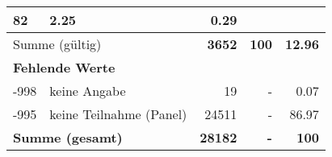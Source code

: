 \begin{longtable}{lXrrr}
       \num{82} &
       \num[round-mode=places,round-precision=2]{2.25} &
         \num[round-mode=places,round-precision=2]{0.29} \\
     \midrule
     \multicolumn{2}{l}{Summe (gültig)} &
       \textbf{\num{3652}} &
     \textbf{100} &
       \textbf{\num[round-mode=places,round-precision=2]{12.96}} \\
     \multicolumn{5}{l}{\textbf{Fehlende Werte}}\\
       -998 &
       keine Angabe &
         \num{19} &
        - &
         \num[round-mode=places,round-precision=2]{0.07} \\
       -995 &
       keine Teilnahme (Panel) &
         \num{24511} &
        - &
         \num[round-mode=places,round-precision=2]{86.97} \\
     \midrule
     \multicolumn{2}{l}{\textbf{Summe (gesamt)}} &
          \textbf{\num{28182}} &
        \textbf{-} &
        \textbf{100} \\
     \bottomrule
     \end{longtable}
     
